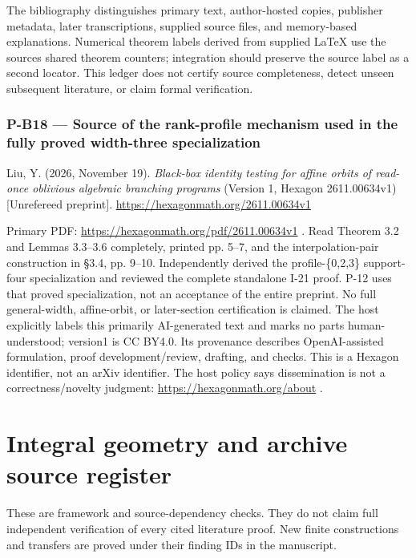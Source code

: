 \documentclass[11pt,a4paper]{article}
\theoremstyle{definition}\newtheorem{definition}{Definition}
\begin{document}
The bibliography distinguishes primary text, author-hosted copies,
publisher metadata, later transcriptions, supplied source files, and
memory-based explanations. Numerical theorem labels derived from
supplied LaTeX use the source\textquotesingle s shared theorem counters;
integration should preserve the source label as a second locator. This
ledger does not certify source completeness, detect unseen subsequent
literature, or claim formal verification.

\subsubsection{P-B18 --- Source of the rank-profile mechanism used in
the fully proved width-three
specialization}\label{p-b18--source-of-the-rank-profile-mechanism-used-in-the-fully-proved-width-three-specialization}

Liu, Y. (2026, November 19). \emph{Black-box identity testing for affine
orbits of read-once oblivious algebraic branching programs} (Version 1,
Hexagon 2611.00634v1) {[}Unrefereed preprint{]}.
\url{https://hexagonmath.org/2611.00634v1}

Primary PDF: \url{https://hexagonmath.org/pdf/2611.00634v1} . Read
Theorem 3.2 and Lemmas 3.3--3.6 completely, printed pp. 5--7, and the
interpolation-pair construction in §3.4, pp. 9--10. Independently
derived the profile-\{0,2,3\} support-four specialization and reviewed
the complete standalone I-21 proof. P-12 uses that proved
specialization, not an acceptance of the entire preprint. No full
general-width, affine-orbit, or later-section certification is claimed.
The host explicitly labels this primarily AI-generated text and marks no
parts human-understood; version1 is CC BY4.0. Its provenance describes
OpenAI-assisted formulation, proof development/review, drafting, and
checks. This is a Hexagon identifier, not an arXiv identifier. The host
policy says dissemination is not a correctness/novelty judgment:
\url{https://hexagonmath.org/about} .
\section{Integral geometry and archive source
register}\label{integral-geometry-and-archive-source-register}

These are framework and source-dependency checks. They do not claim full
independent verification of every cited literature proof. New finite
constructions and transfers are proved under their finding IDs in the
manuscript.
\end{document}
